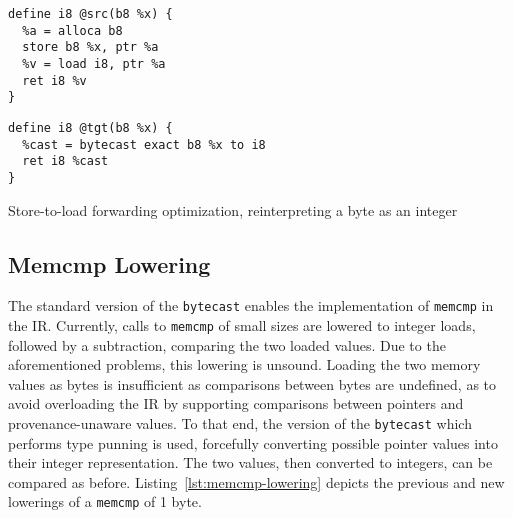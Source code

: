 \documentclass[a4paper,12pt]{article}
\begin{document}
\begin{listing}[h]
  \begin{minipage}{0.45\textwidth}
    \begin{verbatim}
define i8 @src(b8 %x) {
  %a = alloca b8
  store b8 %x, ptr %a
  %v = load i8, ptr %a
  ret i8 %v
}
    \end{verbatim}
  \end{minipage}
  \begin{minipage}{0.45\textwidth}
    \begin{verbatim}
define i8 @tgt(b8 %x) {
  %cast = bytecast exact b8 %x to i8
  ret i8 %cast
}
    \end{verbatim}
  \end{minipage}
  \caption{Store-to-load forwarding optimization, reinterpreting a byte as an integer}
  \label{lst:slf-sroa}
\end{listing}

\subsection{Memcmp Lowering}

The standard version of the \texttt{bytecast} enables the implementation of \texttt{memcmp} in the IR.
Currently, calls to \texttt{memcmp} of small sizes are lowered to integer loads, followed by a subtraction, comparing the two loaded values.
Due to the aforementioned problems, this lowering is unsound.
Loading the two memory values as bytes is insufficient as comparisons between bytes are undefined, as to avoid overloading the IR by supporting comparisons between pointers and provenance-unaware values.
To that end, the version of the \texttt{bytecast} which performs type punning is used, forcefully converting possible pointer values into their integer representation.
The two values, then converted to integers, can be compared as before.
Listing~\ref{lst:memcmp-lowering} depicts the previous and new lowerings of a \texttt{memcmp} of 1 byte.
\end{document}
